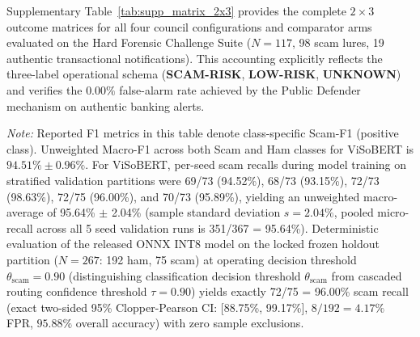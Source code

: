 \documentclass[journal]{IEEEtran}
\begin{document}
Supplementary Table~\ref{tab:supp_matrix_2x3} provides the complete $2 \times 3$ outcome matrices for all four council configurations and comparator arms evaluated on the Hard Forensic Challenge Suite ($N = 117$, 98 scam lures, 19 authentic transactional notifications). This accounting explicitly reflects the three-label operational schema (\textbf{SCAM-RISK}, \textbf{LOW-RISK}, \textbf{UNKNOWN}) and verifies the $0.00\%$ false-alarm rate achieved by the Public Defender mechanism on authentic banking alerts.

\begin{table}[t]
\centering
\caption{Multi-Seed Validation Performance across 5 Independent Training Runs ($K=5$) and Released INT8 Model Benchmark on Locked Frozen Holdout ($N=267$)}
\label{tab:benchmark_summary}
\vspace{1ex}
\parbox{\textwidth}{\footnotesize \textit{Note:} Reported F1 metrics in this table denote class-specific Scam-F1 (positive class). Unweighted Macro-F1 across both Scam and Ham classes for ViSoBERT is $94.51\% \pm 0.96\%$. For ViSoBERT, per-seed scam recalls during model training on stratified validation partitions were 69/73 (94.52\%), 68/73 (93.15\%), 72/73 (98.63\%), 72/75 (96.00\%), and 70/73 (95.89\%), yielding an unweighted macro-average of 95.64\% $\pm$ 2.04\% (sample standard deviation $s=2.04\%$, pooled micro-recall across all 5 seed validation runs is 351/367 = 95.64\%). Deterministic evaluation of the released ONNX INT8 model on the locked frozen holdout partition ($N=267$: 192 ham, 75 scam) at operating decision threshold $\theta_{\text{scam}}=0.90$ (distinguishing classification decision threshold $\theta_{\text{scam}}$ from cascaded routing confidence threshold $\tau = 0.90$) yields exactly 72/75 = 96.00\% scam recall (exact two-sided 95\% Clopper-Pearson CI: [88.75\%, 99.17\%], $8/192 = 4.17\%$ FPR, $95.88\%$ overall accuracy) with zero sample exclusions.}

\end{table}
\end{document}
